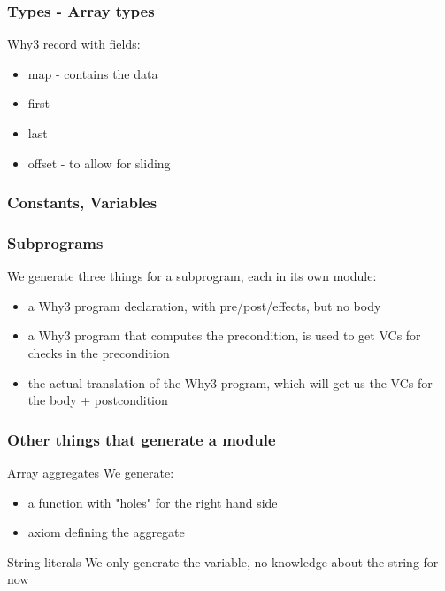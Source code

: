 \documentclass{beamer}
\newenvironment{specialframe}{%
  \begin{frame}[fragile,environment=specialframe]}{\end{frame}}
\begin{document}
\begin{specialframe}\frametitle{Types - Array types}
   \begin{block}{Why3 record with fields:}
      \begin{itemize}
         \item map - contains the data
         \item first
         \item last
         \item offset - to allow for sliding
      \end{itemize}
   \end{block}
\end{specialframe}

\begin{specialframe}\frametitle{Constants, Variables}
\end{specialframe}

\begin{specialframe}\frametitle{Subprograms}

We generate three things for a subprogram, each in its own module:
   \begin{itemize}
      \item a Why3 program declaration, with pre/post/effects, but no body
      \item a Why3 program that computes the precondition, is used to get VCs
for checks in the precondition
      \item the actual translation of the Why3 program, which will get us the
VCs for the body + postcondition
   \end{itemize}
\end{specialframe}

\begin{specialframe}\frametitle{Other things that generate a module}

   \begin{block}{Array aggregates}
      We generate:
   \begin{itemize}
      \item a function with "holes" for the right hand side
      \item axiom defining the aggregate
   \end{itemize}
   \end{block}
   \begin{block}{String literals}
      We only generate the variable, no knowledge about the string for now
   \end{block}
\end{specialframe}
\end{document}
